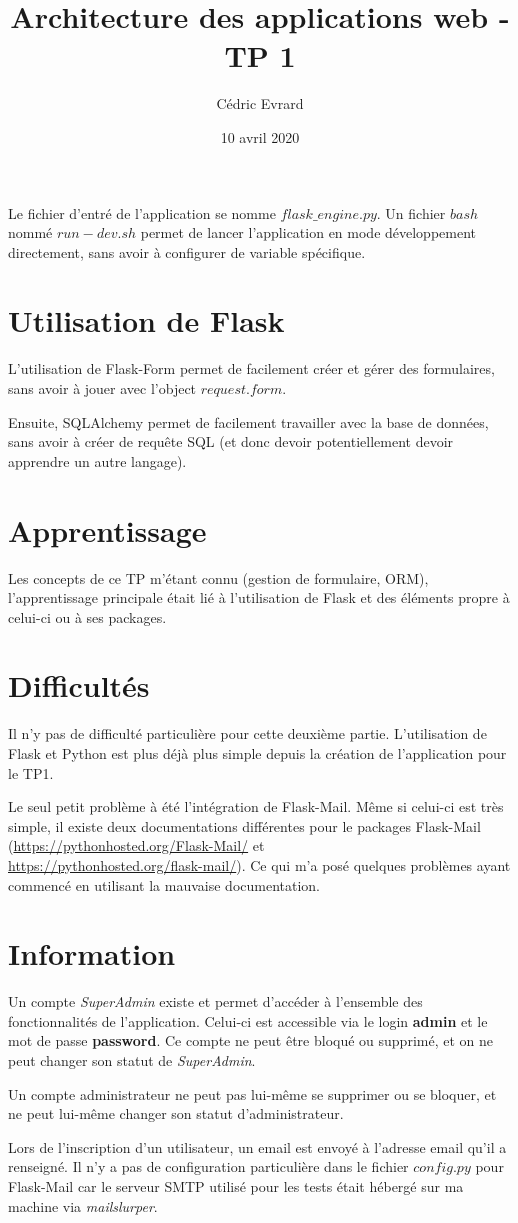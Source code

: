 \documentclass{article}
\title{Architecture des applications web - TP 1}
\author{Cédric Evrard}
\date{10 avril 2020}
\begin{document}
\maketitle

Le fichier d'entré de l'application se nomme $flask\_engine.py$. Un fichier $bash$ nommé $run-dev.sh$ permet de lancer l'application en mode développement directement, sans avoir à configurer de variable spécifique.

\section{Utilisation de Flask}
L'utilisation de Flask-Form permet de facilement créer et gérer des formulaires, sans avoir à jouer avec l'object $request.form$.

Ensuite, SQLAlchemy permet de facilement travailler avec la base de données, sans avoir à créer de requête SQL (et donc devoir potentiellement devoir apprendre un autre langage).



\section{Apprentissage}
Les concepts de ce TP m'étant connu (gestion de formulaire, ORM), l'apprentissage principale était lié à l'utilisation de Flask et des éléments propre à celui-ci ou à ses packages.

\section{Difficultés}
Il n'y pas de difficulté particulière pour cette deuxième partie. L'utilisation de Flask et Python est plus déjà plus simple depuis la création de l'application pour le TP1.

Le seul petit problème à été l'intégration de Flask-Mail. Même si celui-ci est très simple, il existe deux documentations différentes pour le packages Flask-Mail (\hyperref[https://pythonhosted.org/Flask-Mail/]{https://pythonhosted.org/Flask-Mail/} et\\ \hyperref[https://pythonhosted.org/flask-mail/]{https://pythonhosted.org/flask-mail/}). Ce qui m'a posé quelques problèmes ayant commencé en utilisant la mauvaise documentation.

\section{Information}
Un compte \emph{SuperAdmin} existe et permet d'accéder à l'ensemble des fonctionnalités de l'application. Celui-ci est accessible via le login \textbf{admin} et le mot de passe \textbf{password}. Ce compte ne peut être bloqué ou supprimé, et on ne peut changer son statut de \emph{SuperAdmin}.

Un compte administrateur ne peut pas lui-même se supprimer ou se bloquer, et ne peut lui-même changer son statut d'administrateur.

Lors de l'inscription d'un utilisateur, un email est envoyé à l'adresse email qu'il a renseigné. Il n'y a pas de configuration particulière dans le fichier $config.py$ pour Flask-Mail car le serveur SMTP utilisé pour les tests était hébergé sur ma machine via \emph{mailslurper}.
\end{document}

